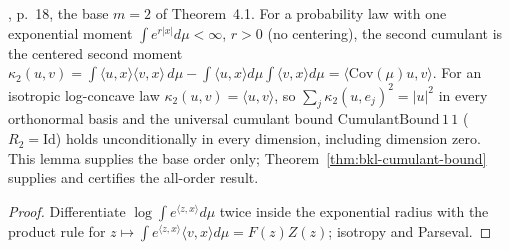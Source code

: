\begin{lemma}
  \label{lem:bkl-second-cumulant-base}
  \leanok
  \cite{BizeulKlartagLehec2026}, p.~18, the base $m=2$ of Theorem~4.1.  For a probability law with
  one exponential moment $\int e^{r|x|}d\mu<\infty$, $r>0$ (no centering), the second cumulant is the
  centered second moment $\kappa_2(u,v)=\int\langle u,x\rangle\langle v,x\rangle\,d\mu-\int\langle u,x\rangle d\mu\int\langle v,x\rangle d\mu
  =\langle\mathrm{Cov}(\mu)u,v\rangle$.  For an isotropic log-concave law $\kappa_2(u,v)=\langle u,v\rangle$,
  so $\sum_j\kappa_2(u,e_j)^2=|u|^2$ in every orthonormal basis and the universal cumulant bound
  $\mathrm{CumulantBound}\,1\,1$ ($R_2=\mathrm{Id}$) holds unconditionally in every dimension, including
  dimension zero. This lemma supplies the base order only; Theorem~\ref{thm:bkl-cumulant-bound} supplies and certifies the all-order result.
\end{lemma}
\begin{proof}
  \leanok
  Differentiate $\log\int e^{\langle z,x\rangle}d\mu$ twice inside the exponential radius with the
  product rule for $z\mapsto\int e^{\langle z,x\rangle}\langle v,x\rangle d\mu=F(z)Z(z)$; isotropy and Parseval.
\end{proof}

